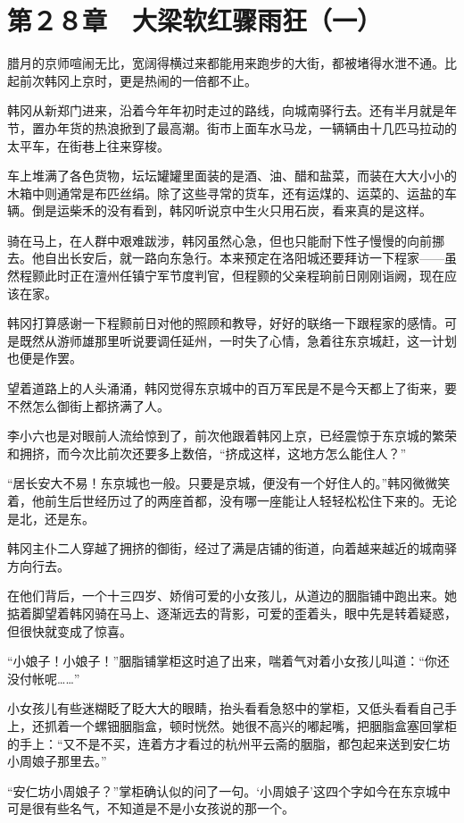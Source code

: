 \section{第２８章　大梁软红骤雨狂（一）}

腊月的京师喧闹无比，宽阔得横过来都能用来跑步的大街，都被堵得水泄不通。比起前次韩冈上京时，更是热闹的一倍都不止。

韩冈从新郑门进来，沿着今年年初时走过的路线，向城南驿行去。还有半月就是年节，置办年货的热浪掀到了最高潮。街市上面车水马龙，一辆辆由十几匹马拉动的太平车，在街巷上往来穿梭。

车上堆满了各色货物，坛坛罐罐里面装的是酒、油、醋和盐菜，而装在大大小小的木箱中则通常是布匹丝绢。除了这些寻常的货车，还有运煤的、运菜的、运盐的车辆。倒是运柴禾的没有看到，韩冈听说京中生火只用石炭，看来真的是这样。

骑在马上，在人群中艰难跋涉，韩冈虽然心急，但也只能耐下性子慢慢的向前挪去。他自出长安后，就一路向东急行。本来预定在洛阳城还要拜访一下程家——虽然程颢此时正在澶州任镇宁军节度判官，但程颢的父亲程珦前日刚刚诣阙，现在应该在家。

韩冈打算感谢一下程颢前日对他的照顾和教导，好好的联络一下跟程家的感情。可是既然从游师雄那里听说要调任延州，一时失了心情，急着往东京城赶，这一计划也便是作罢。

望着道路上的人头涌涌，韩冈觉得东京城中的百万军民是不是今天都上了街来，要不然怎么御街上都挤满了人。

李小六也是对眼前人流给惊到了，前次他跟着韩冈上京，已经震惊于东京城的繁荣和拥挤，而今次比前次还要多上数倍，“挤成这样，这地方怎么能住人？”

“居长安大不易！东京城也一般。只要是京城，便没有一个好住人的。”韩冈微微笑着，他前生后世经历过了的两座首都，没有哪一座能让人轻轻松松住下来的。无论是北，还是东。

韩冈主仆二人穿越了拥挤的御街，经过了满是店铺的街道，向着越来越近的城南驿方向行去。

在他们背后，一个十三四岁、娇俏可爱的小女孩儿，从道边的胭脂铺中跑出来。她掂着脚望着韩冈骑在马上、逐渐远去的背影，可爱的歪着头，眼中先是转着疑惑，但很快就变成了惊喜。

“小娘子！小娘子！”胭脂铺掌柜这时追了出来，喘着气对着小女孩儿叫道：“你还没付帐呢……”

小女孩儿有些迷糊眨了眨大大的眼睛，抬头看看急怒中的掌柜，又低头看看自己手上，还抓着一个螺钿胭脂盒，顿时恍然。她很不高兴的嘟起嘴，把胭脂盒塞回掌柜的手上：“又不是不买，连着方才看过的杭州平云斋的胭脂，都包起来送到安仁坊小周娘子那里去。”

“安仁坊小周娘子？”掌柜确认似的问了一句。‘小周娘子’这四个字如今在东京城中可是很有些名气，不知道是不是小女孩说的那一个。

